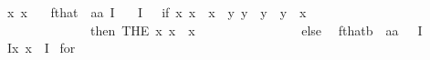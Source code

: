 \begin{isabellebody}
\ \ {\isachardoublequoteopen}\isactrlbold {\isasymforall}x{\isachardot}\ {\isasymphi}{\isacharparenleft}x{\isacharparenright}\ {\isasymequiv}\ \isactrlbold {\isasymforall}{\isasymphi}{\isachardoublequoteclose}\isanewline
{}\isamarkupfalse%
\ f{\isacharunderscore}that\ {\isacharcolon}{\isacharcolon}\ {\isachardoublequoteopen}{\isacharparenleft}{\isacharprime}a{\isasymRightarrow}{\isasymsigma}{\isacharparenright}{\isasymRightarrow}{\isacharprime}a{\isachardoublequoteclose}\ {\isacharparenleft}{\isachardoublequoteopen}\isactrlbold I{\isachardoublequoteclose}{\isacharparenright}\ \isanewline
\ \ {\isachardoublequoteopen}\isactrlbold I\ {\isasymPhi}\ {\isasymequiv}\ if\ {\isasymexists}x{\isachardot}\ {\isasymA}{\isacharparenleft}x{\isacharparenright}\ {\isasymand}\ {\isasymPhi}{\isacharparenleft}x{\isacharparenright}\ {\isasymand}\ {\isacharparenleft}{\isasymforall}y{\isachardot}\ {\isacharparenleft}{\isasymA}{\isacharparenleft}y{\isacharparenright}\ {\isasymand}\ {\isasymPhi}{\isacharparenleft}y{\isacharparenright}{\isacharparenright}\ {\isasymlongrightarrow}\ {\isacharparenleft}y\ {\isacharequal}\ x{\isacharparenright}{\isacharparenright}\ \isanewline
\ \ \ \ \ \ \ \ \ \ \ \ \ \ \ then\ THE\ x{\isachardot}\ {\isasymA}{\isacharparenleft}x{\isacharparenright}\ {\isasymand}\ {\isasymPhi}{\isacharparenleft}x{\isacharparenright}\ \isanewline
\ \ \ \ \ \ \ \ \ \ \ \ \ \ \ else\ \isactrlbold {\isasymstar}{\isachardoublequoteclose}\isanewline
{}\isamarkupfalse%
\ f{\isacharunderscore}that{\isacharunderscore}b\ {\isacharcolon}{\isacharcolon}\ {\isachardoublequoteopen}{\isacharparenleft}{\isacharprime}a{\isasymRightarrow}{\isasymsigma}{\isacharparenright}{\isasymRightarrow}{\isacharprime}a{\isachardoublequoteclose}\ \ {\isacharparenleft}\ {\isachardoublequoteopen}\isactrlbold I{\isachardoublequoteclose}\ {\isacharbrackleft}{}{\isacharbrackright}\ {}{\isacharparenright}\ \isanewline
\ \ {\isachardoublequoteopen}\isactrlbold Ix{\isachardot}\ {\isasymphi}{\isacharparenleft}x{\isacharparenright}\ {\isasymequiv}\ \isactrlbold I{\isacharparenleft}{\isasymphi}{\isacharparenright}{\isachardoublequoteclose}\isanewline
\isanewline
\isanewline
\isanewline
{}\isamarkupfalse%
\ f{\isacharunderscore}or\ {\isacharcolon}{\isacharcolon}\ {\isachardoublequoteopen}{\isasymsigma}{\isasymRightarrow}{\isasymsigma}{\isasymRightarrow}{\isasymsigma}{\isachardoublequoteclose}\ {\isacharparenleft}\ {\isachardoublequoteopen}\isactrlbold {\isasymor}{\isachardoublequoteclose}\ {}{}{\isacharparenright}\ \ \ \ \ \ \ \ \ \isanewline

\end{isabellebody}
